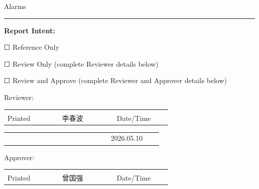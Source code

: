 \documentclass[UTF8,10pt,a4paper,fontset=fandol]{ctexart}
\newcommand{\fieldvalue}[1]{#1}
\newcommand{\handwritten}[1]{#1}
\newcommand{\checkboxfield}[1]{\ifstrequal{#1}{checked}{☑}{\ifstrequal{#1}{unclear}{?}{☐}}}
\begin{document}
\hfill
\begin{minipage}[t]{0.48\linewidth}
\centering
Alarms

\vspace{0.2em}
\rule{\linewidth}{0.4pt}
\end{minipage}

\vspace{1.2em}

\noindent\textbf{Report Intent:}

\noindent
\fieldvalue{\checkboxfield{unchecked}} Reference Only

\noindent
\fieldvalue{\checkboxfield{unchecked}} Review Only (complete Reviewer details below)

\noindent
\fieldvalue{\checkboxfield{unchecked}} Review and Approve (complete Reviewer and Approver details below)

\vspace{0.6em}

\noindent Reviewer:

\vspace{0.8em}
\noindent
\begin{tabular}{p{0.25\linewidth}p{0.25\linewidth}p{0.25\linewidth}}
\hrulefill & \hrulefill & \hrulefill \\
Printed &
\fieldvalue{\handwritten{李春波}} &
Date/Time
\end{tabular}

\vspace{0.3em}

\noindent
\begin{tabular}{p{0.25\linewidth}p{0.25\linewidth}p{0.25\linewidth}}
&
&
\fieldvalue{\handwritten{2026.05.10}}
\end{tabular}

\vspace{0.6em}

\noindent Approver:

\vspace{0.8em}
\noindent
\begin{tabular}{p{0.25\linewidth}p{0.25\linewidth}p{0.25\linewidth}}
\hrulefill & \hrulefill & \hrulefill \\
Printed &
\fieldvalue{\handwritten{曾国强}} &
Date/Time
\end{tabular}
\end{document}

